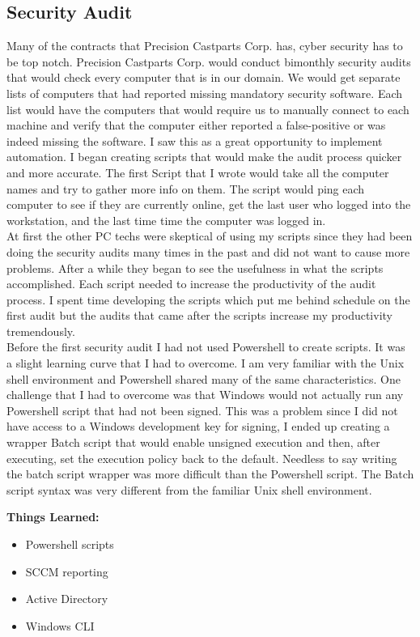 \documentclass[letterpaper,10pt,notitlepage,fleqn]{article}
\begin{document}
\subsection{Security Audit}
\indent Many of the contracts that Precision Castparts Corp. has, cyber security has to be top 
notch. Precision Castparts Corp. would conduct bimonthly security audits that would check every computer 
that is in our domain. We would get separate lists of computers that had reported 
missing mandatory security software. Each list would have the computers that would require us to manually connect to each machine and 
verify that the computer either reported a false-positive or was indeed missing 
the software. I saw this as a great opportunity to implement automation. I began 
creating scripts that would make the audit process quicker and more accurate. The 
first Script that I wrote would take all the computer names and try to gather more 
info on them. The script would ping each computer to see if they are currently 
online, get the last user who logged into the workstation, and the last time time 
the computer was logged in. 
\\
\indent
At first the other PC techs were skeptical of using my scripts since they had been 
doing the security audits many times in the past and did not want to cause more 
problems. After a while they began to see the usefulness in what the scripts accomplished. 
Each script needed to increase the productivity of the audit process. I spent time 
developing the scripts which put me behind schedule on the first audit but the 
audits that came after the scripts increase my productivity tremendously.
\\
\indent Before the first security audit I had not used Powershell to create scripts.
It was a slight learning curve that I had to overcome. I am very familiar with the 
Unix shell environment and Powershell shared many of the same characteristics. One 
challenge that I had to overcome was that Windows would not actually run any Powershell 
script that had not been signed. This was a problem since I did not have access to 
a Windows development key for signing, I ended up creating a wrapper Batch script 
that would enable unsigned execution and then, after executing, set the execution 
policy back to the default. Needless to say writing the batch script wrapper was more 
difficult than the Powershell script. The Batch script syntax was very different 
from the familiar Unix shell environment. 

\textbf{Things Learned:}
\begin{itemize} 
        \item Powershell scripts
        \item SCCM reporting
        \item Active Directory
        \item Windows CLI
    \end{itemize}
\end{document}
